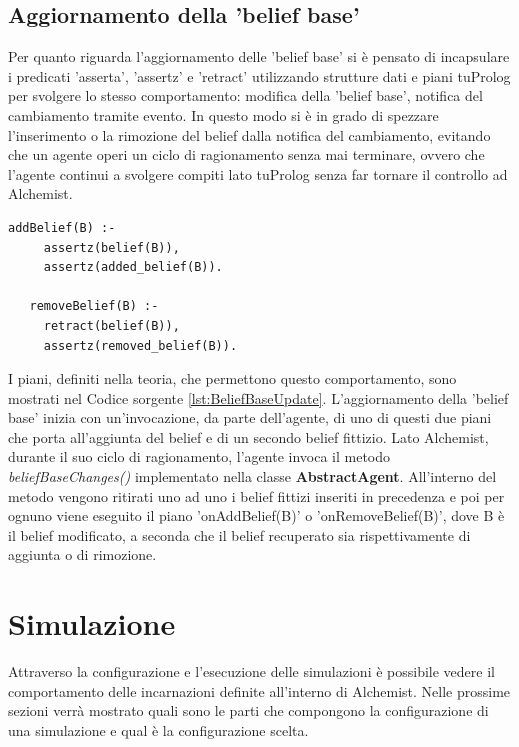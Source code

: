 \documentclass[12pt,a4paper,openright,twoside]{report}
\begin{document}
\subsection{Aggiornamento della 'belief base'}
Per quanto riguarda l'aggiornamento delle 'belief base' si \`e pensato di incapsulare i predicati 'asserta', 'assertz' e 'retract' utilizzando strutture dati e piani tuProlog per svolgere lo stesso comportamento: modifica della 'belief base', notifica del cambiamento tramite evento. In questo modo si \`e in grado di spezzare l'inserimento o la rimozione del belief dalla notifica del cambiamento, evitando che un agente operi un ciclo di ragionamento senza mai terminare, ovvero che l'agente continui a svolgere compiti lato tuProlog senza far tornare il controllo ad Alchemist.
\medskip
\begin{lstlisting}[firstnumber=1,label={lst:BeliefBaseUpdate},caption={Piani per l'aggiornamenot della 'belief base'}]
   addBelief(B) :-
     assertz(belief(B)),
     assertz(added_belief(B)).

   removeBelief(B) :-
     retract(belief(B)),
     assertz(removed_belief(B)).
\end{lstlisting}
I piani, definiti nella teoria, che permettono questo comportamento, sono mostrati nel Codice sorgente \ref{lst:BeliefBaseUpdate}.
L'aggiornamento della 'belief base' inizia con un'invocazione, da parte dell'agente, di uno di questi due piani che porta all'aggiunta del belief e di un secondo belief fittizio.
Lato Alchemist, durante il suo ciclo di ragionamento, l'agente invoca il metodo \textit{beliefBaseChanges()} implementato nella classe \textbf{AbstractAgent}.
All'interno del metodo vengono ritirati uno ad uno i belief fittizi inseriti in precedenza e poi per ognuno viene eseguito il piano 'onAddBelief(B)' o 'onRemoveBelief(B)', dove B \`e il belief modificato, a seconda che il belief recuperato sia rispettivamente di aggiunta o di rimozione.


\section{Simulazione}
Attraverso la configurazione e l'esecuzione delle simulazioni \`e possibile vedere il comportamento delle incarnazioni definite all'interno di Alchemist. Nelle prossime sezioni verr\`a mostrato quali sono le parti che compongono la configurazione di una simulazione e qual \`e la configurazione scelta.
\end{document}
